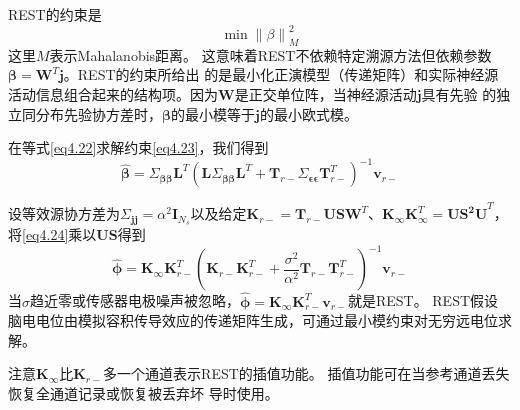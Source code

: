 REST的约束是
\begin{equation}\label{eq4.23}
\min{\lVert{\beta}\rVert}_M^2
\end{equation}
这里$M$表示Mahalanobis距离。 这意味着REST不依赖特定溯源方法但依赖参数$\mathbf{\beta}=\mathbf{W}^T\mathbf{j}$。REST的约束所给出
的是最小化正演模型（传递矩阵）和实际神经源活动信息组合起来的结构项。因为$\mathbf{W}$是正交单位阵，当神经源活动$\mathbf{j}$具有先验
的独立同分布先验协方差时，$\mathbf{\beta}$的最小模等于$\mathbf{j}$的最小欧式模。

在等式\eqref{eq4.22}求解约束\eqref{eq4.23}，我们得到
\begin{equation}\label{eq4.24}
\hat{\mathbf{\beta}}=\Sigma_{\mathbf{\beta\beta}}\mathbf{L}^T(\mathbf{L}\Sigma_\mathbf{\beta\beta}\mathbf{L}^T+\mathbf{T}_{r-}\Sigma_{\mathbf{\epsilon\epsilon}}\mathbf{T}_{r-}^T)^{-1}\mathbf{v}_{r-}
\end{equation}

设等效源协方差为$\Sigma_\mathbf{jj}=\alpha^2\mathbf{I}_{N_s}$以及给定$\mathbf{K}_{r-}=\mathbf{T}_{r-}\mathbf{USW}^T$、$\mathbf{K}_{\infty}\mathbf{K}_{\infty}^T=\mathbf{US^2U}^T$，将\eqref{eq4.24}乘以$\mathbf{US}$得到
\begin{equation*}
\hat{\mathbf{\phi}}=\mathbf{K}_{\infty}\mathbf{K}_{r-}^T(\mathbf{K}_{r-}\mathbf{K}_{r-}^T+\frac{\sigma^2}{\alpha^2}\mathbf{T}_{r-}\mathbf{T}_{r-}^T)^{-1}\mathbf{v}_{r-}
\end{equation*}
当$\sigma$趋近零或传感器电极噪声被忽略，$\hat{\mathbf{\phi}}=\mathbf{K}_{\infty}\mathbf{K}_{r-}^T\mathbf{v}_{r-}$就是REST。
REST假设脑电电位由模拟容积传导效应的传递矩阵生成，可通过最小模约束对无穷远电位求解。

注意$\mathbf{K}_{\infty}$比$\mathbf{K}_{r-}$多一个通道表示REST的插值功能。 插值功能可在当参考通道丢失恢复全通道记录或恢复被丢弃坏
导时使用。

